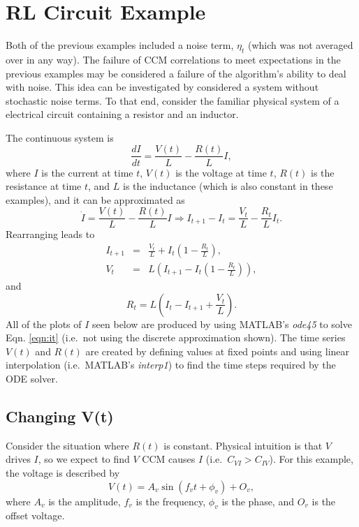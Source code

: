 \documentclass[a4paper,11pt]{article}
\begin{document}
\section{RL Circuit Example}
Both of the previous examples included a noise term, $\eta_t$ (which was not averaged over in any way).  The failure of CCM correlations to meet expectations in the previous examples may be considered a failure of the algorithm's ability to deal with noise.  This idea can be investigated by considered a system without stochastic noise terms.  To that end, consider the familiar physical system of a electrical circuit containing a resistor and an inductor.

The continuous system is
\begin{equation}
\label{eqn:it}
\frac{dI}{dt} = \frac{V(t)}{L} - \frac{R(t)}{L} I,
\end{equation}
where $I$ is the current at time $t$, $V(t)$ is the voltage at time $t$, $R(t)$ is the resistance at time $t$, and $L$ is the inductance (which is also constant in these examples), and it can be approximated as
\begin{equation}
\dot{I} = \frac{V(t)}{L} - \frac{R(t)}{L} I\Rightarrow I_{t+1}-I_t = \frac{V_t}{L} - \frac{R_t}{L} I_t.
\end{equation}
Rearranging leads to
\begin{eqnarray}
I_{t+1} &=& \frac{V_t}{L}+I_t\left(1-\frac{R_t}{L}\right),\\
V_t &=& L\left(I_{t+1}-I_t\left(1-\frac{R_t}{L}\right)\right),
\end{eqnarray}
and
\begin{equation}
R_t = L\left(I_t-I_{t+1}+\frac{V_t}{L}\right).
\end{equation}
All of the plots of $I$ seen below are produced by using MATLAB's {\em ode45} to solve Eqn. \ref{eqn:it} (i.e.\ not using the discrete approximation shown).  The time series $V(t)$ and $R(t)$ are created by defining values at fixed points and using linear interpolation (i.e.\ MATLAB's {\em interp1}) to find the time steps required by the ODE solver.  

\subsection{Changing V(t)}
Consider the situation where $R(t)$ is constant.  Physical intuition is that $V$ drives $I$, so we expect to find $V$ CCM causes $I$ (i.e.\ $C_{VI}>C_{IV}$).  For this example, the voltage is described by 
\begin{equation}
V(t) = A_v \sin\left(f_v t+\phi_v\right)+O_v,
\end{equation}
where $A_v$ is the amplitude, $f_v$ is the frequency, $\phi_v$ is the phase, and $O_v$ is the offset voltage.
\end{document}
